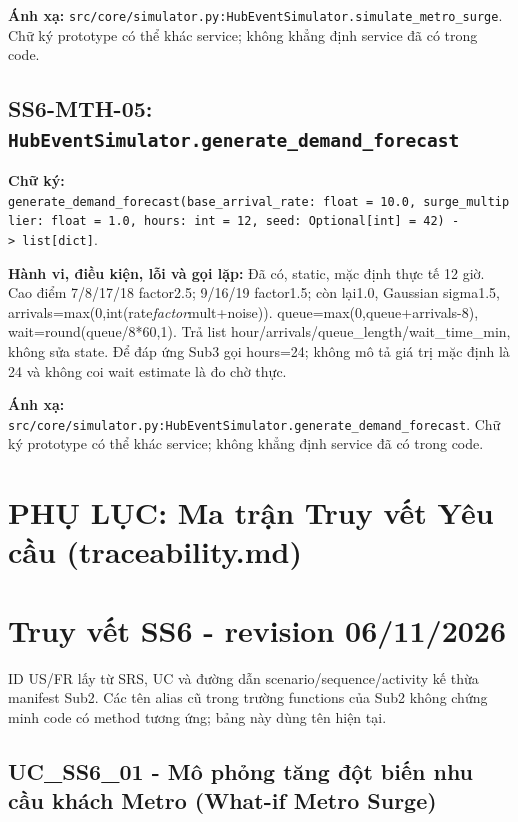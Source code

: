 \documentclass[11pt,a4paper]{article}
\begin{document}
\textbf{Ánh xạ:}
\texttt{src/core/simulator.py:HubEventSimulator.simulate\_metro\_surge}.
Chữ ký prototype có thể khác service; không khẳng định service đã có
trong code.

\hypertarget{ss6-mth-05-hubeventsimulator.generate_demand_forecast}{%
\subsection{\texorpdfstring{SS6-MTH-05:
\texttt{HubEventSimulator.generate\_demand\_forecast}}{SS6-MTH-05: HubEventSimulator.generate\_demand\_forecast}}\label{ss6-mth-05-hubeventsimulator.generate_demand_forecast}}

\textbf{Chữ ký:}
\texttt{generate\_demand\_forecast(base\_arrival\_rate:\ float\ =\ 10.0,\ surge\_multiplier:\ float\ =\ 1.0,\ hours:\ int\ =\ 12,\ seed:\ Optional{[}int{]}\ =\ 42)\ -\textgreater{}\ list{[}dict{]}}.

\textbf{Hành vi, điều kiện, lỗi và gọi lặp:} Đã có, static, mặc định
thực tế 12 giờ. Cao điểm 7/8/17/18 factor2.5; 9/16/19 factor1.5; còn
lại1.0, Gaussian sigma1.5,
arrivals=max(0,int(rate\emph{factor}mult+noise)).
queue=max(0,queue+arrivals-8), wait=round(queue/8*60,1). Trả list
hour/arrivals/queue\_length/wait\_time\_min, không sửa state. Để đáp ứng
Sub3 gọi hours=24; không mô tả giá trị mặc định là 24 và không coi wait
estimate là đo chờ thực.

\textbf{Ánh xạ:}
\texttt{src/core/simulator.py:HubEventSimulator.generate\_demand\_forecast}.
Chữ ký prototype có thể khác service; không khẳng định service đã có
trong code.

\newpage
\section*{PHỤ LỤC: Ma trận Truy vết Yêu cầu (traceability.md)}
\hypertarget{truy-vux1ebft-ss6---revision-06112026}{%
\section{Truy vết SS6 - revision
06/11/2026}\label{truy-vux1ebft-ss6---revision-06112026}}

ID US/FR lấy từ SRS, UC và đường dẫn scenario/sequence/activity kế thừa
manifest Sub2. Các tên alias cũ trong trường functions của Sub2 không
chứng minh code có method tương ứng; bảng này dùng tên hiện tại.

\hypertarget{uc_ss6_01---muxf4-phux1ecfng-tux103ng-ux111ux1ed9t-biux1ebfn-nhu-cux1ea7u-khuxe1ch-metro-what-if-metro-surge}{%
\subsection{UC\_SS6\_01 - Mô phỏng tăng đột biến nhu cầu khách Metro
(What-if Metro
Surge)}\label{uc_ss6_01---muxf4-phux1ecfng-tux103ng-ux111ux1ed9t-biux1ebfn-nhu-cux1ea7u-khuxe1ch-metro-what-if-metro-surge}}
\end{document}
